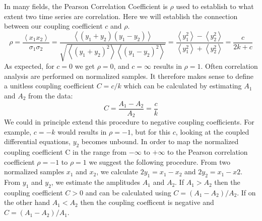 \documentclass[%
 reprint,
 amsmath,amssymb,
 aps,
]{revtex4-1}
\begin{document}
In many fields, the Pearson Correlation Coefficient is $\rho$ used to establish to what extent two time series are correlation.  Here we will establish the connection between our coupling coefficient $c$ and $\rho$.
\begin{equation}
	\rho = \frac{\left<x_{1}x_{2}\right>}{\sigma_{1}\sigma_{2}} = \frac{\left<(y_{1}+y_{2})(y_{1}-y_{2})\right>}{\sqrt{\left<(y_{1}+y_{2})^{2}\right>\left<(y_{1}-y_{2})^{2}\right>}} = \frac{\left<y_{1}^{2}\right>-\left<y_{2}^{2}\right>}{\left<y_{1}^{2}\right>+\left<y_{2}^{2}\right>} = \frac{c}{2k+c}
\end{equation}
As expected, for $c=0$ we get $\rho=0$, and $c=\infty$ results in $\rho=1$. Often correlation analysis are performed on normalized samples.  It therefore makes sense to define a unitless coupling coefficient $C=c/k$  which can be calculated by estimating $A_1$ and $A_2$ from the data:
\begin{equation}
	C = \frac{A_{1}-A_{2}}{A_{2}}=\frac{c}{k}
\end{equation}
We could in principle extend this procedure to negative coupling coefficients.  For example, $c=-k$ would results in $\rho=-1$, but for this $c$, looking at the coupled differential equations, $y_2$ becomes unbound.  In order to map the normalized coupling coefficient C in the range from $-\infty$ to $+\infty$ to the Pearson correlation coefficient $\rho=-1$ to $\rho=1$ we suggest the following procedure.  From two normalized samples $x_1$ and $x_2$, we calculate $2y_{1}=x_{1}-x_{2}$ and $2y_{2}=x_{1}-x{2}$.  From $y_1$ and $y_2$, we estimate the amplitudes $A_{1}$ and $A_{2}$.  If $A_{1}>A_{2}$ then the coupling coefficient $C>0$ and can be calculated using $C=(A_{1}-A_{2})/A_{2}$.  If on the other hand $A_{1}<A_{2}$ then the coupling coefficent is negative and $C=(A_{1}-A_{2})/A_{1}$.

\begin{figure}[H]
\begin{center}
\caption{}\label{fig:corr}
\end{center}
\end{figure}
\end{document}
